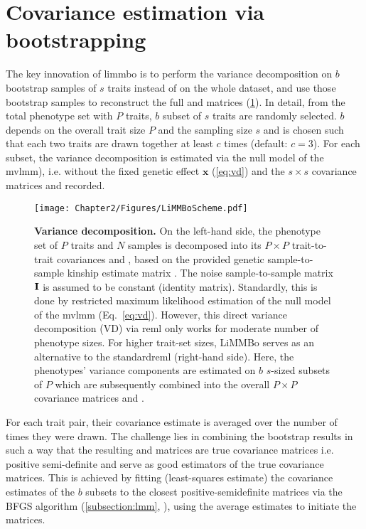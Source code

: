 \section{Covariance estimation via bootstrapping}
\label{section:bootstrapping-limmbo}
The key innovation of \gls{limmbo} is to perform the variance decomposition on \(b\) bootstrap samples of \(s\) traits instead of on the whole dataset, and use those bootstrap samples to reconstruct the full  and  matrices (\cref{fig:vd}). In detail, from the total phenotype set with \(P\) traits, \(b\) subset of \(s\) traits are randomly selected.  \(b\) depends on the overall trait size \(P\) and the sampling size \(s\) and is chosen such that each two traits are drawn together at least \(c\) times (default: \(c=3\)). For each subset, the variance decomposition is estimated via the null model of the \gls{mvlmm}), i.e. without the fixed genetic effect \(\mathbf{x}\) (\cref{eq:vd}) and the $s \times s$ covariance matrices  and recorded. 
%
\begin{figure}[hbtp]
	\centering
	\texttt{[image: Chapter2/Figures/LiMMBoScheme.pdf]}
	\caption[\textbf{Variance decomposition.}]{\textbf{Variance decomposition.} On the left-hand side, the phenotype set of \(P\) traits and \(N\) samples is decomposed into its \(P \times P\) trait-to-trait covariances  and , based on the provided genetic sample-to-sample kinship estimate matrix . The noise sample-to-sample matrix \(\boldsymbol{\mathbf{I}}\) is assumed to be constant (identity matrix). Standardly, this is done by restricted maximum likelihood estimation of the null model of the \gls{mvlmm} (Eq.~\ref{eq:vd}). However, this direct variance decomposition (VD) via \gls{reml} only works for moderate number of phenotype sizes. For higher trait-set sizes, LiMMBo serves as an alternative to the standard\gls{reml} (right-hand side). Here, the phenotypes' variance components are estimated on \(b\) \(s\)-sized subsets of \(P\) which are subsequently combined into the overall \(P \times P\) covariance matrices  and .} 
	 	\label{fig:vd}
\end{figure}
%
For each trait pair, their covariance estimate is averaged over the number of times they were drawn. The challenge lies in combining the bootstrap results in such a way that the resulting  and  matrices are true covariance matrices i.e. positive semi-definite and serve as good estimators of the true covariance matrices. This is achieved by fitting (least-squares estimate) the covariance estimates of the \(b\) subsets to the closest positive-semidefinite matrices via the BFGS algorithm (\cref{subsection:lmm}, \citep{Byrd1995}), using the average estimates to initiate the matrices. 


